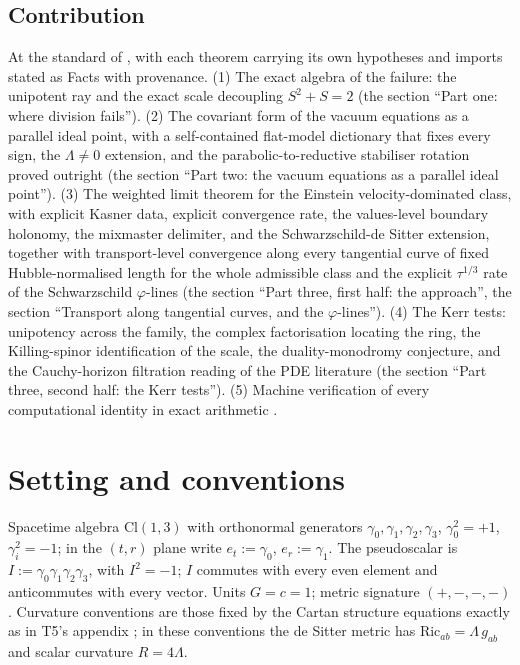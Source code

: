 \documentclass[11pt]{article}
\theoremstyle{definition}
\theoremstyle{plain}
\providecommand{\Cl}{}\renewcommand{\Cl}{\mathrm{Cl}}
\providecommand{\Ric}{}\renewcommand{\Ric}{\mathrm{Ric}}
\providecommand{\er}{}\renewcommand{\er}{e_r}
\providecommand{\et}{}\renewcommand{\et}{e_t}
\begin{document}
\subsection*{Contribution}
\label{c:note.interior.setting-contribution}
At the standard of \cite{ButlerT1}, with each theorem carrying its own hypotheses and imports stated as Facts with provenance. (1) The exact algebra of the failure: the unipotent ray and the exact scale decoupling $S^2 + S = 2$ (the section ``Part one: where division fails''). (2) The covariant form of the vacuum equations as a parallel ideal point, with a self-contained flat-model dictionary that fixes every sign, the $\Lambda \neq 0$ extension, and the parabolic-to-reductive stabiliser rotation proved outright (the section ``Part two: the vacuum equations as a parallel ideal point''). (3) The weighted limit theorem for the Einstein velocity-dominated class, with explicit Kasner data, explicit convergence rate, the values-level boundary holonomy, the mixmaster delimiter, and the Schwarzschild-de Sitter extension, together with transport-level convergence along every tangential curve of fixed Hubble-normalised length for the whole admissible class and the explicit $\tau^{1/3}$ rate of the Schwarzschild $\varphi$-lines (the section ``Part three, first half: the approach'', the section ``Transport along tangential curves, and the $\varphi$-lines''). (4) The Kerr tests: unipotency across the family, the complex factorisation locating the ring, the Killing-spinor identification of the scale, the duality-monodromy conjecture, and the Cauchy-horizon filtration reading of the PDE literature (the section ``Part three, second half: the Kerr tests''). (5) Machine verification of every computational identity in exact arithmetic \cite{ButlerVerifyT06}.

\section{Setting and conventions}

\label{c:note.interior.setting-setting-conventions}
Spacetime algebra $\Cl(1,3)$ with orthonormal generators $\gamma_0, \gamma_1, \gamma_2, \gamma_3$, $\gamma_0^2 = +1$, $\gamma_i^2 = -1$; in the $(t,r)$ plane write $\et := \gamma_0$, $\er := \gamma_1$. The pseudoscalar is $I := \gamma_0\gamma_1\gamma_2\gamma_3$, with $I^2 = -1$; $I$ commutes with every even element and anticommutes with every vector. Units $G = c = 1$; metric signature $(+,-,-,-)$. Curvature conventions are those fixed by the Cartan structure equations exactly as in T5's appendix \cite[App.~A]{ButlerT5}; in these conventions the de Sitter metric has $\Ric_{ab} = \Lambda\, g_{ab}$ and scalar curvature $R = 4\Lambda$.
\end{document}
